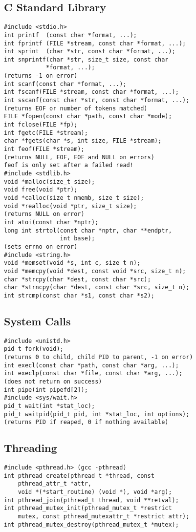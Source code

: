 \documentclass[10pt, a4paper]{article}
\begin{document}
\begin{multicols}{4}
    \subsection*{C Standard Library}
    \begin{lstlisting}
#include <stdio.h>
int printf  (const char *format, ...);
int fprintf (FILE *stream, const char *format, ...);
int sprint  (char *str, const char *format, ...);
int snprintf(char *str, size_t size, const char  
            *format, ...);
(returns -1 on error)
int scanf(const char *format, ...);
int fscanf(FILE *stream, const char *format, ...);
int sscanf(const char *str, const char *format, ...);
(returns EOF or number of tokens matched)
FILE *fopen(const char *path, const char *mode);
int fclose(FILE *fp);
int fgetc(FILE *stream);
char *fgets(char *s, int size, FILE *stream);
int feof(FILE *stream);
(returns NULL, EOF, EOF and NULL on errors)
feof is only set after a failed read!
#include <stdlib.h>
void *malloc(size_t size);
void free(void *ptr);
void *calloc(size_t nmemb, size_t size);
void *realloc(void *ptr, size_t size);
(returns NULL on error)
int atoi(const char *nptr);
long int strtol(const char *nptr, char **endptr, 
                int base);
(sets errno on error)
#include <string.h>
void *memset(void *s, int c, size_t n);
void *memcpy(void *dest, const void *src, size_t n);
char *strcpy(char *dest, const char *src);
char *strncpy(char *dest, const char *src, size_t n);
int strcmp(const char *s1, const char *s2);
    \end{lstlisting}

    \subsection*{System Calls}
    \begin{lstlisting}
#include <unistd.h>
pid_t fork(void);
(returns 0 to child, child PID to parent, -1 on error)
int execl(const char *path, const char *arg, ...);
int execlp(const char *file, const char *arg, ...);
(does not return on success)
int pipe(int pipefd[2]);
#include <sys/wait.h>
pid_t wait(int *stat_loc);
pid_t waitpid(pid_t pid, int *stat_loc, int options);
(returns PID if reaped, 0 if nothing available)
    \end{lstlisting}

    \subsection*{Threading}
    \begin{lstlisting}
#include <pthread.h> (gcc -pthread)
int pthread_create(pthread_t *thread, const 
    pthread_attr_t *attr, 
    void *(*start_routine) (void *), void *arg);
int pthread_join(pthread_t thread, void **retval);
int pthread_mutex_init(pthread_mutex_t *restrict
    mutex, const pthread_mutexattr_t *restrict attr);
int pthread_mutex_destroy(pthread_mutex_t *mutex);
    \end{lstlisting}


\end{multicols}
\end{document}
